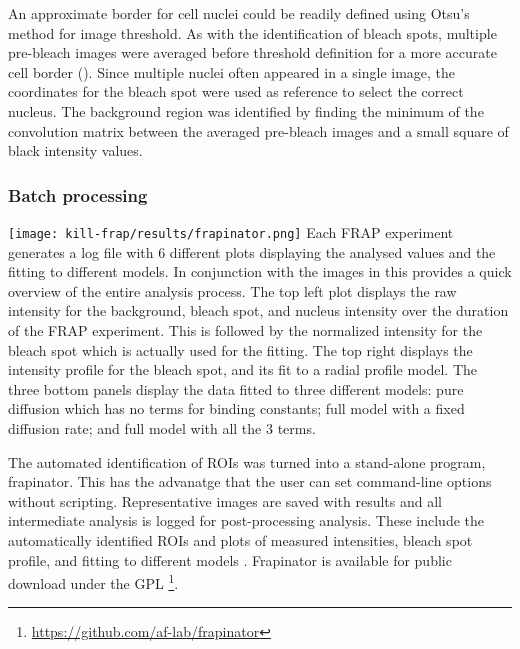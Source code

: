       An approximate border for cell nuclei could be readily defined using Otsu's method for image threshold.
      As with the identification of bleach spots, multiple pre-bleach images
      were averaged before threshold definition for a more accurate cell border ().
      Since multiple nuclei often appeared in a single image, the coordinates for the bleach spot
      were used as reference to select the correct nucleus.
      The background region was identified by finding the minimum of the convolution matrix
      between the averaged pre-bleach images and a small square of black intensity values.

    \subsubsection{Batch processing}

      \begin{sidewaysfigure}
        \texttt{[image: kill-frap/results/frapinator.png]}
          {
            Each FRAP experiment generates a log file with 6 different plots
            displaying the analysed values and the fitting to different models.
            In conjunction with the images in  this
            provides a quick overview of the entire analysis process.
            The top left plot displays the raw intensity
            for the background, bleach spot, and nucleus intensity over the
            duration of the FRAP experiment. This is followed by the normalized
            intensity for the bleach spot which is actually used for the
            fitting. The top right displays the intensity
            profile for the bleach spot, and its fit to a radial profile
            model. The three bottom panels display the data fitted to three
            different models: pure diffusion which has no terms for binding
            constants; full model with a fixed diffusion rate; and full model
            with all the 3 terms.
          }
        \label{fig:kill-frap:frapinator}
      \end{sidewaysfigure}

      The automated identification of ROIs was turned into a stand-alone program, frapinator.
      This has the advanatge that the user can set command-line options without scripting.
      Representative images are saved with results and all intermediate analysis is logged for post-processing analysis.
      These include the automatically identified ROIs and
      plots of measured intensities, bleach spot profile, and fitting to different models .
      Frapinator is available for public download under the GPL \footnote{\url{https://github.com/af-lab/frapinator}}.

